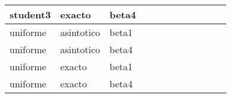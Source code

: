 \documentclass[]{article}
\begin{document}
\begin{table}[H]
\begin{tabular}{l|l|l|l|l|l|l|l|l|l|l|l}
\hline
student3 & exacto & beta4 & \cellcolor{white}{\textcolor{blue}{0.9}} & \cellcolor{white}{\textcolor{blue}{0.893}} & \cellcolor{white}{\textcolor{blue}{0.9013}} & \cellcolor{white}{\textcolor{blue}{0.897}} & \cellcolor{white}{\textcolor{blue}{0.8933}} & \cellcolor{white}{\textcolor{blue}{0.8957}} & \cellcolor{white}{\textcolor{blue}{0.898}} & \cellcolor{white}{\textcolor{blue}{0.908}} & \cellcolor{white}{\textcolor{blue}{0.9093}}\\
\hline
\rowcolor{gray!6}  uniforme & asintotico & beta1 & \cellcolor{gray}{\textcolor{red}{0.84}} & \cellcolor{white}{\textcolor{red}{0.885}} & \cellcolor{white}{\textcolor{blue}{0.8993}} & \cellcolor{white}{\textcolor{blue}{0.8917}} & \cellcolor{white}{\textcolor{blue}{0.895}} & \cellcolor{white}{\textcolor{blue}{0.9007}} & \cellcolor{white}{\textcolor{blue}{0.893}} & \cellcolor{white}{\textcolor{blue}{0.893}} & \cellcolor{white}{\textcolor{blue}{0.8937}}\\
\hline
uniforme & asintotico & beta4 & \cellcolor{gray}{\textcolor{red}{0.828}} & \cellcolor{white}{\textcolor{red}{0.8833}} & \cellcolor{white}{\textcolor{blue}{0.8947}} & \cellcolor{white}{\textcolor{blue}{0.8983}} & \cellcolor{white}{\textcolor{blue}{0.9013}} & \cellcolor{white}{\textcolor{blue}{0.9023}} & \cellcolor{white}{\textcolor{blue}{0.9023}} & \cellcolor{white}{\textcolor{blue}{0.8963}} & \cellcolor{white}{\textcolor{blue}{0.898}}\\
\hline
\rowcolor{gray!6}  uniforme & exacto & beta1 & \cellcolor{white}{\textcolor{blue}{0.8993}} & \cellcolor{white}{\textcolor{blue}{0.9}} & \cellcolor{white}{\textcolor{blue}{0.903}} & \cellcolor{white}{\textcolor{blue}{0.8927}} & \cellcolor{white}{\textcolor{blue}{0.896}} & \cellcolor{white}{\textcolor{blue}{0.9007}} & \cellcolor{white}{\textcolor{blue}{0.8933}} & \cellcolor{white}{\textcolor{blue}{0.893}} & \cellcolor{white}{\textcolor{blue}{0.8937}}\\
\hline
uniforme & exacto & beta4 & \cellcolor{white}{\textcolor{blue}{0.8993}} & \cellcolor{white}{\textcolor{blue}{0.896}} & \cellcolor{white}{\textcolor{blue}{0.899}} & \cellcolor{white}{\textcolor{blue}{0.9}} & \cellcolor{white}{\textcolor{blue}{0.902}} & \cellcolor{white}{\textcolor{blue}{0.9027}} & \cellcolor{white}{\textcolor{blue}{0.9027}} & \cellcolor{white}{\textcolor{blue}{0.8963}} & \cellcolor{white}{\textcolor{blue}{0.898}}\\
\hline
\end{tabular}
\end{table}
\end{document}

